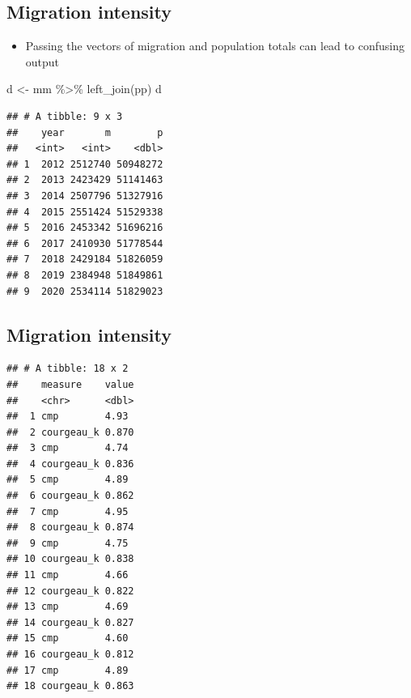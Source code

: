 \documentclass[
]{book}
\newenvironment{Shaded}{\begin{snugshade}}{\end{snugshade}}
\newcommand{\AttributeTok}[1]{\textcolor[rgb]{0.77,0.63,0.00}{#1}}
\newcommand{\FunctionTok}[1]{\textcolor[rgb]{0.00,0.00,0.00}{#1}}
\newcommand{\NormalTok}[1]{#1}
\newcommand{\OtherTok}[1]{\textcolor[rgb]{0.56,0.35,0.01}{#1}}
\newcommand{\SpecialCharTok}[1]{\textcolor[rgb]{0.00,0.00,0.00}{#1}}
\providecommand{\tightlist}{%
  \setlength{\itemsep}{0pt}\setlength{\parskip}{0pt}}
\begin{document}
\hypertarget{migration-intensity-7}{%
\subsection{Migration intensity}\label{migration-intensity-7}}

\begin{itemize}
\tightlist
\item
  Passing the vectors of migration and population totals can lead to confusing output
\end{itemize}

\begin{Shaded}
\begin{Highlighting}[]
\NormalTok{d }\OtherTok{\textless{}{-}}\NormalTok{ mm }\SpecialCharTok{\%\textgreater{}\%}
  \FunctionTok{left\_join}\NormalTok{(pp)}
\NormalTok{d}
\end{Highlighting}
\end{Shaded}

\begin{verbatim}
## # A tibble: 9 x 3
##    year       m        p
##   <int>   <int>    <dbl>
## 1  2012 2512740 50948272
## 2  2013 2423429 51141463
## 3  2014 2507796 51327916
## 4  2015 2551424 51529338
## 5  2016 2453342 51696216
## 6  2017 2410930 51778544
## 7  2018 2429184 51826059
## 8  2019 2384948 51849861
## 9  2020 2534114 51829023
\end{verbatim}

\hypertarget{migration-intensity-8}{%
\subsection{Migration intensity}\label{migration-intensity-8}}

\begin{Shaded}
\end{Shaded}

\begin{verbatim}
## # A tibble: 18 x 2
##    measure    value
##    <chr>      <dbl>
##  1 cmp        4.93 
##  2 courgeau_k 0.870
##  3 cmp        4.74 
##  4 courgeau_k 0.836
##  5 cmp        4.89 
##  6 courgeau_k 0.862
##  7 cmp        4.95 
##  8 courgeau_k 0.874
##  9 cmp        4.75 
## 10 courgeau_k 0.838
## 11 cmp        4.66 
## 12 courgeau_k 0.822
## 13 cmp        4.69 
## 14 courgeau_k 0.827
## 15 cmp        4.60 
## 16 courgeau_k 0.812
## 17 cmp        4.89 
## 18 courgeau_k 0.863
\end{verbatim}
\end{document}
